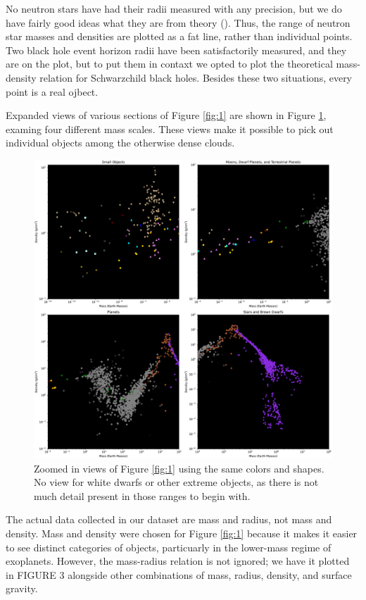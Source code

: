 \documentclass[twocolumn,linenumbers]{aastex631}
\begin{document}
No neutron stars have had their radii measured with any precision, but we do have fairly good ideas what they are from theory (). Thus, the range of neutron star masses and densities are plotted as a fat line, rather than individual points. Two black hole event horizon radii have been satisfactorily measured, and they are on the plot, but to put them in contaxt we opted to plot the theoretical mass-density relation for Schwarzchild black holes. Besides these two situations, every point is a real ojbect. 

Expanded views of various sections of Figure \ref{fig:1} are shown in Figure \ref{fig:2}, examing four different mass scales. These views make it possible to pick out individual objects among the otherwise dense clouds.  

\begin{figure}[htbp]
\centering
\includegraphics[scale = 0.35]{ZoomViews.pdf}
\centering
\caption{Zoomed in views of  Figure \ref{fig:1} using the same colors and shapes. No view for white dwarfs or other extreme objects, as there is not much detail present in those ranges to begin with.}
\label{fig:2}
\end{figure}

The actual data collected in our dataset are mass and radius, not mass and density. Mass and density were chosen for Figure \ref{fig:1} because it makes it easier to see distinct categories of objects, particuarly in the lower-mass regime of exoplanets. However, the mass-radius relation is not ignored; we have it plotted in FIGURE 3 alongside other combinations of mass, radius, density, and surface gravity. 
\end{document}

